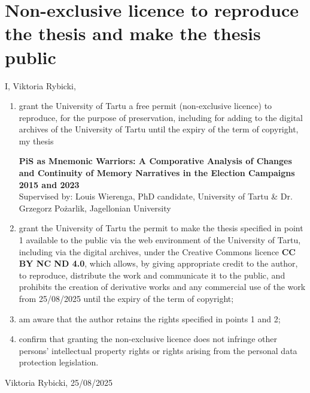 \section{Non-exclusive licence to reproduce the thesis and make the thesis public}

I, Viktoria Rybicki,

\begin{enumerate}[nosep]
\item grant the University of Tartu a free permit (non-exclusive licence) to reproduce, for the purpose of preservation, including for adding to the digital archives of the University of Tartu until the expiry of the term of copyright, my thesis \vspace{0.3cm}

\textbf{PiS as Mnemonic Warriors: A Comporative Analysis of Changes and Continuity of Memory Narratives in the Election Campaigns 2015 and 2023} \\[0.3cm]
Supervised by: Louis Wierenga, PhD candidate, University of Tartu \&
Dr. Grzegorz Pożarlik, Jagellonian University \vspace{0.3cm}

\item grant the University of Tartu the permit to make the thesis specified in point 1 available to the public via the web environment of the University of Tartu, including via the digital archives, under the Creative Commons licence \textbf{CC BY NC ND 4.0}, which allows, by giving appropriate credit to the author, to reproduce, distribute the work and communicate it to the public, and prohibits the creation of derivative works and any commercial use of the work from 25/08/2025 until the expiry of the term of copyright; \vspace{0.3cm}

\item am aware that the author retains the rights specified in points 1 and 2; \vspace{0.3cm}

\item confirm that granting the non-exclusive licence does not infringe other persons’ intellectual property rights or rights arising from the personal data protection legislation. \vspace{0.3cm}

\end{enumerate}

\vfill

Viktoria Rybicki, 25/08/2025 \\